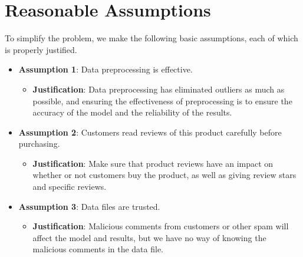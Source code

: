 \documentclass[../mcmpaper]{subfiles}
\begin{document}
	\section{Reasonable Assumptions}
	To simplify the problem, we make the following basic assumptions, each of which is properly justified.
    \begin{itemize}[nosep]
        \item \textbf{Assumption 1}: Data preprocessing is effective.
        \begin{itemize}[label=, leftmargin=0pt, itemindent=\parindent]
            \item \textbf{Justification}: Data preprocessing has eliminated outliers as much as possible, and ensuring the effectiveness of preprocessing is to ensure the accuracy of the model and the reliability of the results.
        \end{itemize}
            \item \textbf{Assumption 2}: Customers read reviews of this product carefully before purchasing.
            \begin{itemize}[label=, leftmargin=0pt, itemindent=\parindent]
                \item \textbf{Justification}: Make sure that product reviews have an impact on whether or not customers buy the product, as well as giving review stars and specific reviews.
            \end{itemize}
        \item \textbf{Assumption 3}: Data files are trusted.
        \begin{itemize}[label=, leftmargin=0pt, itemindent=\parindent]
            \item \textbf{Justification}: Malicious comments from customers or other spam will affect the model and results, but we have no way of knowing the malicious comments in the data file.
        \end{itemize}
    \end{itemize}
\end{document}
